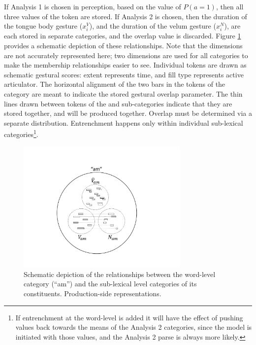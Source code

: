 If Analysis 1 is chosen in perception, based on the value of $P(a=1)$,
then all three values of the token are stored. If Analysis 2 is chosen,
then the duration of the tongue body gesture ($x_{i}^{V}$), and the
duration of the velum gesture ($x_{i}^{N}$), are each stored in separate
categories, and the overlap value is discarded. Figure \ref{fig:MultiParse-Reps}
provides a schematic depiction of these relationships. Note that the
dimensions are not accurately represented here; two dimensions are
used for all categories to make the membership relationships easier
to see. Individual tokens are drawn as schematic gestural scores:
extent represents time, and fill type represents active articulator.
The horizontal alignment of the two bars in the tokens of the category
are meant to indicate the stored gestural overlap parameter. The thin
lines drawn between tokens of the and sub-categories indicate that
they are stored together, and will be produced together. Overlap must
be determined via a separate distribution. Entrenchment happens only
within individual sub-lexical categories\footnote{If entrenchment at the word-level is added it will have the effect
of pushing values back towards the means of the Analysis 2 categories,
since the model is initiated with those values, and the Analysis 2
parse is always more likely. }.

\begin{figure}[H]

\includegraphics[width=0.75\textwidth]{figures/MultiParseModel.pdf}\caption{\label{fig:MultiParse-Reps}Schematic depiction of the relationships
between the word-level category (“am”) and the sub-lexical level
categories of its constituents. Production-side representations.}

\end{figure}

